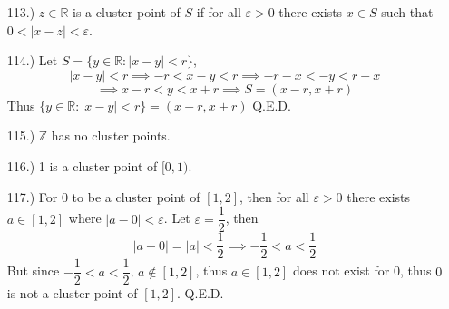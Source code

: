 \documentclass[12pt]{article}
\newcommand{\vertb}[1]{\left\vert#1\right\vert}
\begin{document}
\begin{itemize}










    \item [113.)] $z\in\mathbb{R}$ is a cluster point of $S$ if for all $\varepsilon>0$ there exists $x\in S$ such that $0<\vertb{x-z}<\varepsilon$.

    \item [114.)] Let $S=\{y\in\mathbb{R}:\vertb{x-y}<r\}$,
    \[\vertb{x-y}<r\implies-r<x-y<r\implies -r-x<-y<r-x\]
    \[\implies x-r<y<x+r\implies S=(x-r,x+r)\]
    Thus $\{y\in\mathbb{R}:\vertb{x-y}<r\}=(x-r,x+r)$ Q.E.D.
    
    \item [115.)] $\mathbb{Z}$ has no cluster points.
    
    \item [116.)] 1 is a cluster point of $[0,1)$.

    \item [117.)] For $0$ to be a cluster point of $[1,2]$, then for all $\varepsilon>0$ there exists $a\in[1,2]$ where $\vertb{a-0}<\varepsilon$. Let $\varepsilon=\dfrac{1}{2}$, then
    \[\vertb{a-0}=\vertb{a}<\frac{1}{2}\implies -\frac{1}{2}<a<\frac{1}{2}\]
    But since $-\dfrac{1}{2}<a<\dfrac{1}{2}$, $a\notin[1,2]$, thus $a\in[1,2]$ does not exist for 0, thus $0$ is not a cluster point of $[1,2]$. Q.E.D.





\end{itemize}
\end{document}
